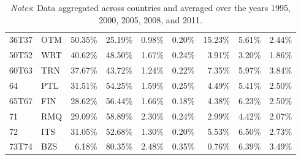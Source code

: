 \documentclass[a4paper,11pt]{article}
\begin{document}
\begin{table}[h]
\begin{tabular}{llrrrrrrr}
    36T37 & OTM   & 50.35\% & 25.19\% & 0.98\% & 0.20\% & 15.23\% & 5.61\% & 2.44\% \\
    50T52 & WRT   & 40.62\% & 48.50\% & 1.67\% & 0.24\% & 3.91\% & 3.20\% & 1.86\% \\
    60T63 & TRN   & 37.67\% & 43.72\% & 1.24\% & 0.22\% & 7.35\% & 5.97\% & 3.84\% \\
    64    & PTL   & 31.51\% & 54.25\% & 1.59\% & 0.25\% & 4.49\% & 5.41\% & 2.50\% \\
    65T67 & FIN   & 28.62\% & 56.44\% & 1.66\% & 0.18\% & 4.38\% & 6.23\% & 2.50\% \\
    71    & RMQ   & 29.09\% & 58.89\% & 2.30\% & 0.24\% & 2.99\% & 4.42\% & 2.07\% \\
    72    & ITS   & 31.05\% & 52.68\% & 1.30\% & 0.20\% & 5.53\% & 6.50\% & 2.73\% \\
    73T74 & BZS   & 6.18\% & 80.35\% & 2.48\% & 0.35\% & 0.76\% & 6.39\% & 3.49\% \\
   \bottomrule
   \end{tabular}
         \caption*{\textit{Notes}: Data aggregated across countries and averaged over the years 1995, 2000, 2005, 2008, and 2011.}
\end{table}
\end{document}
